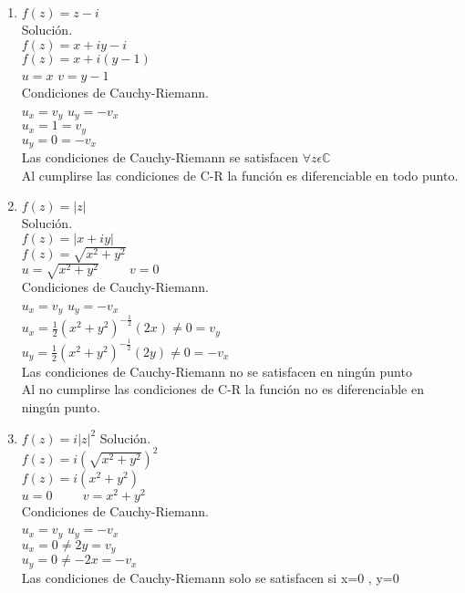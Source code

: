 \begin{enumerate}
\item $f(z)= z-i$ \\
Soluci\'on.\\
$f(z)=x+iy-i$\\
$f(z)=x+i(y-1)$\\
$u=x$ \hspace{1cm} $v=y-1$\\
Condiciones de Cauchy-Riemann.\\
$u_x=v_y$ \hspace{1cm} $u_y=-v_x$\\
$u_x=1=v_y$\\
$u_y=0=-v_x$\\
Las condiciones de Cauchy-Riemann se satisfacen $\forall z \epsilon \mathbb{C}$\\
Al cumplirse las condiciones de C-R la funci\'on es diferenciable en todo punto.
\item $f(z)= |z|$\\
Soluci\'on.\\
$f(z)=|x+iy|$\\
$f(z)=\sqrt{x^2+y^2}$\\
$u=\sqrt{x^2+y^2} \hspace{1cm} v=0$\\
Condiciones de Cauchy-Riemann.\\
$u_x=v_y$ \hspace{1cm} $u_y=-v_x$\\
$u_x=\frac{1}{2}(x^2+y^2)^{-\frac{1}{2}}(2x)\neq 0=v_y$\\
$u_y=\frac{1}{2}(x^2+y^2)^{-\frac{1}{2}}(2y)\neq 0=-v_x$\\
Las condiciones de Cauchy-Riemann no se satisfacen en ning\'un punto\\
Al no cumplirse las condiciones de C-R la funci\'on no es diferenciable en ning\'un punto.
\item $f(z)= i|z|^2$
Soluci\'on.\\
$f(z)=i(\sqrt{x^2+y^2})^2$\\
$f(z)=i(x^2+y^2)$\\
$u=0 \hspace{1cm} v=x^2+y^2$\\
Condiciones de Cauchy-Riemann.\\
$u_x=v_y$ \hspace{1cm} $u_y=-v_x$\\
$u_x = 0 \neq 2y = v_y$\\
$u_y = 0 \neq -2x =-v_x$\\
Las condiciones de Cauchy-Riemann solo se satisfacen si x=0 , y=0 \\

\end{enumerate}
